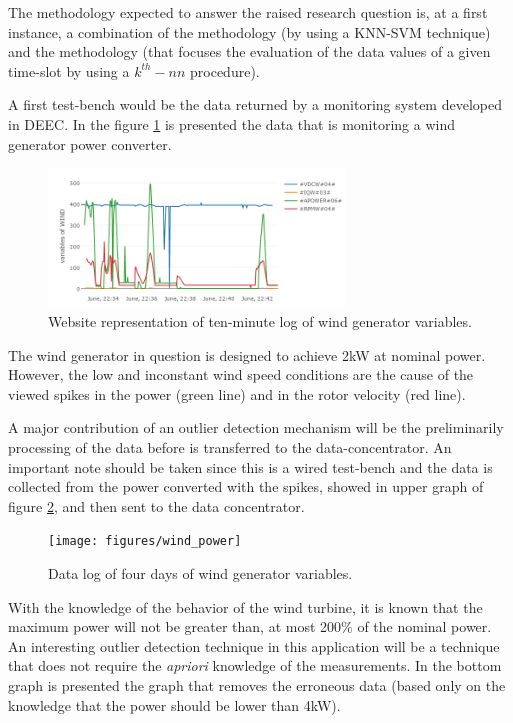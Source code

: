 The methodology expected to answer the raised research question is, at a first instance, a combination of the \cite{class:xu:2012} methodology (by using a KNN-SVM technique) and the \cite{nn:abid:2016} methodology (that focuses the evaluation of the data values of a given time-slot by using a $k^{th}-nn$ procedure).

A first test-bench would be the data returned by a monitoring system developed in DEEC. In the figure \ref{fig:website} is presented the data that is monitoring a wind generator power converter.


\begin{figure}[h!]
	\centering
	\includegraphics[width=0.70\textwidth,keepaspectratio]{figures/website}
	\caption{Website representation of ten-minute log of wind generator variables. }
	\label{fig:website}
\end{figure}

The wind generator in question is designed to achieve 2kW at nominal power. However, the low and inconstant wind speed conditions are the cause of the viewed spikes in the power (green line) and in the rotor velocity (red line).

A major contribution of an outlier detection mechanism will be the preliminarily processing of the data before is transferred to the data-concentrator. An important note should be taken since this is a wired test-bench and the data is collected from the power converted with the spikes, showed in upper graph of figure \ref{fig:wind_power}, and then sent to the data concentrator.

\begin{figure}[h!]
	\centering
	\texttt{[image: figures/wind\_power]}
	\caption{Data log of four days of wind generator variables. }
	\label{fig:wind_power}
\end{figure}

With the knowledge of the behavior of the wind turbine, it is known that the maximum power will not be greater than, at most 200\% of the nominal power. An interesting outlier detection technique in this application will be a technique that does not require the \textit{apriori} knowledge of the measurements. In the bottom graph is presented the graph that removes the erroneous data (based only on the knowledge that the power should be lower than 4kW).


